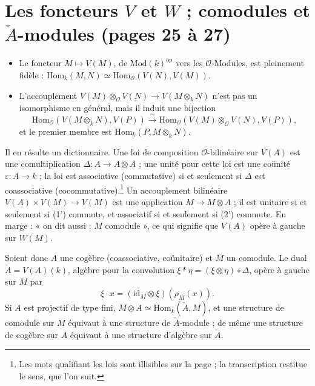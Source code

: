 \documentclass[11pt,a4paper]{article}
\begin{document}
\section*{Les foncteurs $V$ et $W$ ; comodules et $\check{A}$-modules (pages 25 à 27)}

\begin{itemize}
\item[a)] Le foncteur $M \mapsto V(M)$, de $\mathrm{Mod}(k)^{\mathrm{op}}$ vers
les $\mathcal{O}$-Modules, est pleinement fidèle :
$\mathrm{Hom}_{k}(M, N) \simeq \mathrm{Hom}_{\mathcal{O}}(V(N), V(M))$.
\item[b)] L'accouplement $V(M) \otimes_{\mathcal{O}} V(N) \to V(M \otimes_{k} N)$
n'est pas un isomorphisme en général, mais il induit une bijection
\[
  \mathrm{Hom}_{\mathcal{O}}(V(M \otimes_{k} N), V(P)) \xrightarrow{\ \sim\ }
  \mathrm{Hom}_{\mathcal{O}}(V(M) \otimes_{\mathcal{O}} V(N), V(P)) ,
\]
et le premier membre est $\mathrm{Hom}_{k}(P, M \otimes_{k} N)$.
\end{itemize}

Il en résulte un dictionnaire. Une loi de composition $\mathcal{O}$-bilinéaire
sur $V(A)$ est une comultiplication $\Delta \colon A \to A \otimes A$ ; une
unité pour cette loi est une coünité $\varepsilon \colon A \to k$ ; la loi est
associative (commutative) si et seulement si $\Delta$ est coassociative
(cocommutative).\footnote{Les mots qualifiant les lois sont illisibles sur la
page ; la transcription restitue le sens, que l'on suit.}
Un accouplement bilinéaire $V(A) \times V(M) \to V(M)$ est une application
$M \to M \otimes A$ ; il est unitaire si et seulement si (1') commute, et
associatif si et seulement si (2') commute. En marge : « on dit aussi : $M$
comodule », ce qui signifie que $V(A)$ opère à gauche sur $W(M)$.

Soient donc $A$ une cogèbre (coassociative, coünitaire) et $M$ un comodule.
Le dual $\check{A} = V(A)(k)$, algèbre pour la convolution
$\xi * \eta = (\xi \otimes \eta) \circ \Delta$, opère à gauche sur $M$ par
\[
  \xi \cdot x = (\mathrm{id}_{M} \otimes \xi)(\rho_{M}(x)) .
\]
Si $A$ est projectif de type fini, $M \otimes A \simeq \mathrm{Hom}_{k}(\check{A}, M)$,
et une structure de comodule sur $M$ équivaut à une structure de
$\check{A}$-module ; de même une structure de cogèbre sur $A$ équivaut à une
structure d'algèbre sur $\check{A}$.
\end{document}
